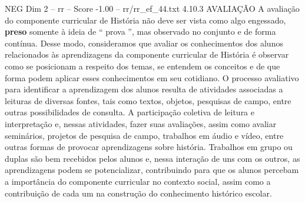 \begin{textsample}{NEG Dim 2 – rr – Score -1.00 – rr/rr\_ef\_44.txt}  \label{ex:f2_neg_185}
4.10.3 AVALIAÇÃO A avaliação do componente curricular de História não deve ser vista como algo engessado, \textbf{preso} somente à ideia de “ prova ”, mas observado no conjunto e de forma contínua.
Desse modo, consideramos que avaliar os conhecimentos dos alunos relacionados às aprendizagens da componente curricular de História é observar como se posicionam a respeito dos temas, se entendem os conceitos e de que forma podem aplicar esses conhecimentos em seu cotidiano.
O processo avaliativo para identificar a aprendizagem dos alunos resulta de atividades associadas a leituras de diversas fontes, tais como textos, objetos, pesquisas de campo, entre outras possibilidades de consulta.
A participação coletiva de leitura e interpretação e, nessas atividades, fazer suas avaliações, assim como avaliar seminários, projetos de pesquisa de campo, trabalhos em áudio e vídeo, entre outras formas de provocar aprendizagens sobre história.
Trabalhos em grupo ou duplas são bem recebidos pelos alunos e, nessa interação de uns com os outros, as aprendizagens podem se potencializar, contribuindo para que os alunos percebam a importância do componente curricular no contexto social, assim como a contribuição de cada um na construção do conhecimento histórico escolar.

\end{textsample}

